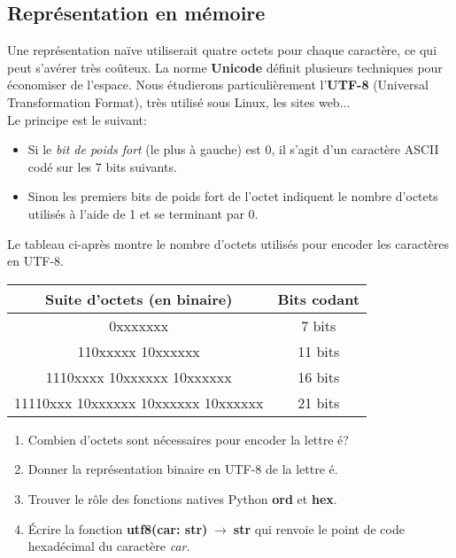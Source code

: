 \documentclass[a4paper,11pt]{article}
\begin{document}
\begin{Form}
\subsection{Représentation en mémoire}
Une représentation naïve utiliserait quatre octets pour chaque caractère, ce qui peut s'avérer très coûteux. La norme \textbf{Unicode} définit plusieurs techniques pour économiser de l'espace. Nous étudierons particulièrement l'\textbf{UTF-8} (Universal Transformation Format), très utilisé sous Linux, les sites web...\\
Le principe est le suivant:
\begin{itemize}
\item Si le \emph{bit de poids fort} (le plus à gauche) est 0, il s'agit d'un caractère ASCII codé sur les 7 bits suivants.
\item Sinon les premiers bits de poids fort de l'octet indiquent le nombre d'octets utilisés à l'aide de 1 et se terminant par 0.
\end{itemize}
Le tableau ci-après montre le nombre d'octets utilisés pour encoder les caractères en UTF-8.
\begin{center}
\begin{tabular}{|c|c|}
\hline 
Suite d'octets (en binaire) & Bits codant \\ 
\hline 
0xxxxxxx & 7 bits \\ 
\hline 
110xxxxx 10xxxxxx & 11 bits \\ 
\hline 
1110xxxx 10xxxxxx 10xxxxxx & 16 bits \\ 
\hline 
11110xxx 10xxxxxx 10xxxxxx 10xxxxxx & 21 bits \\ 
\hline 
\end{tabular}
\end{center}
\begin{activite}
\begin{enumerate}
\item Combien d'octets sont nécessaires pour encoder la lettre é?
\item Donner la représentation binaire en UTF-8 de la lettre é.
\item Trouver le rôle des fonctions natives Python \textbf{ord} et \textbf{hex}.
\item Écrire la fonction \textbf{utf8(car: str)$\;\rightarrow\;$str} qui renvoie le point de code hexadécimal du caractère \emph{car}.
\end{enumerate}
\end{activite}
\end{Form}
\end{document}
